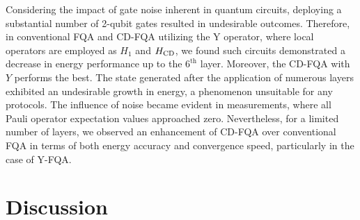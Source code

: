 \documentclass[twocolumn,aps,superscriptaddress,floatfix,longbibliography]{revtex4-2}
\begin{document}
Considering the impact of gate noise inherent in quantum
circuits, deploying a substantial number of 2-qubit gates
 resulted in undesirable outcomes. Therefore, in conventional FQA 
and CD-FQA utilizing the Y operator, where local operators are
employed as $H_1$ and $H_{\rm CD}$, we found such circuits demonstrated a decrease in energy performance up to the $6^{\text{th}}$ layer. Moreover, the CD-FQA with $Y$ performs the best.
The state generated after the application of numerous layers
exhibited an undesirable growth in energy, a phenomenon
unsuitable for any protocols. The influence of noise became
evident in measurements, where all Pauli operator expectation
values approached zero. Nevertheless, for a limited number of
layers, we observed an enhancement of CD-FQA over conventional
FQA in terms of both energy accuracy and convergence speed,
particularly in the case of Y-FQA.






\section{Discussion}
\label{sec:discussion}

\end{document}

